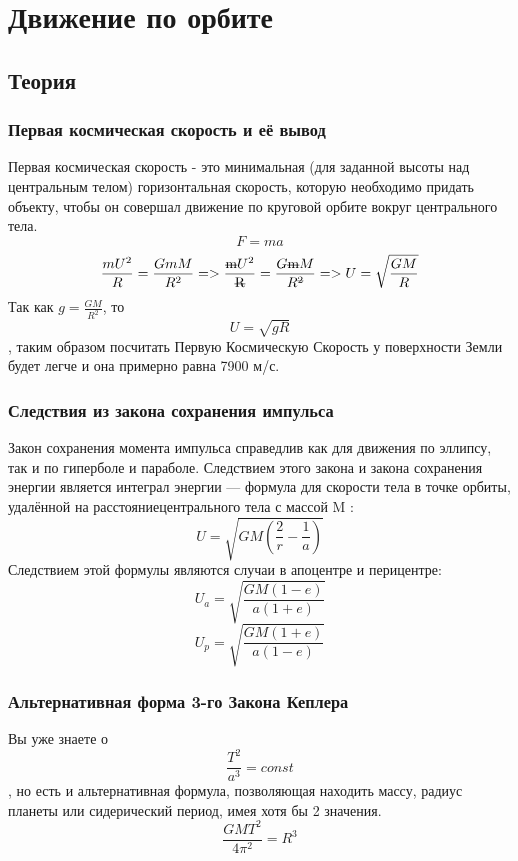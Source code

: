 \documentclass[16pt,a4paper]{report}
\begin{document}
\chapter{Движение по орбите}
\section{Теория}
\subsection{Первая космическая скорость и её вывод}
Первая космическая скорость - это минимальная (для заданной высоты над центральным телом) горизонтальная скорость, которую необходимо придать объекту, чтобы он совершал движение по круговой орбите вокруг центрального тела.
$$F = ma$$
$$\frac{mU^2}{R}=\frac{GmM}{R^2} => \frac{\textrm{\st{m}}U^2}{\textrm{\st{R}}}=\frac{G\textrm{\st{m}}M}{R^{\textrm{\st{2}}}} = > U = \sqrt{\frac{GM}{R}}$$
Так как $g = \frac{GM}{R^2}$, то $$U = \sqrt{gR}$$, таким образом посчитать Первую Космическую Скорость у поверхности Земли будет легче и она примерно равна 7900 м/с.
\subsection{Следствия из закона сохранения импульса}
Закон сохранения момента импульса справедлив как для движения по эллипсу, так и по гиперболе и параболе. Следствием этого закона и закона сохранения энергии является интеграл энергии — формула для скорости тела в точке орбиты, удалённой на расстояниецентрального тела с массой M :
$$U = \sqrt{GM(\frac{2}{r}-\frac{1}{a})}$$
Следствием этой формулы являются случаи в апоцентре и перицентре:
$$U_a =\sqrt{\frac{GM(1-e)}{a(1+e)}}$$
$$U_p =\sqrt{\frac{GM(1+e)}{a(1-e)}}$$
\subsection{Альтернативная форма 3-го Закона Кеплера}
Вы уже знаете о $$\frac{T^2}{a^3}=const$$, но есть и альтернативная формула, позволяющая находить массу, радиус планеты или сидерический период, имея хотя бы 2 значения.
$$\frac{GMT^2}{4\pi^2}=R^3$$
\newpage
\end{document}
